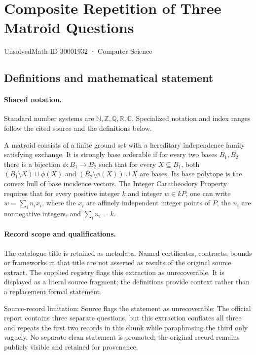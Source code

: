 \documentclass[11pt]{article}
\begin{document}
\setcounter{section}{30001931}
\section{Composite Repetition of Three Matroid Questions}\label{30001932}
{\small\sffamily UnsolvedMath ID 30001932 · Computer Science}
\subsection{Definitions and mathematical statement}

\paragraph{Shared notation.}Standard number systems are $\mathbb N,\mathbb Z,\mathbb Q,\mathbb R,\mathbb C$. Specialized notation and index ranges follow the cited source and the definitions below.


A matroid consists of a finite ground set with a hereditary independence family satisfying exchange. It is strongly base orderable if for every two bases $B_1,B_2$ there is a bijection $\phi:B_1\to B_2$ such that for every $X\subseteq B_1$, both $(B_1\setminus X)\cup\phi(X)$ and $(B_2\setminus\phi(X))\cup X$ are bases. Its base polytope is the convex hull of base incidence vectors. The Integer Caratheodory Property requires that for every positive integer $k$ and integer $w\in kP$, one can write $w=\sum_i n_ix_i$, where the $x_i$ are affinely independent integer points of $P$, the $n_i$ are nonnegative integers, and $\sum_i n_i=k$.
\paragraph{Record scope and qualifications.}
The catalogue title is retained as metadata. Named certificates, contracts, bounds or frameworks in that title are not asserted as results of the original source extract.
The supplied registry flags this extraction as unrecoverable. It is displayed as a literal source fragment; the definitions provide context rather than a replacement formal statement.

Source-record limitation: Source flags the statement as unrecoverable: The official report contains three separate questions, but this extraction conflates all three and repeats the first two records in this chunk while paraphrasing the third only vaguely. No separate clean statement is promoted; the original record remains publicly visible and retained for provenance.
\end{document}
